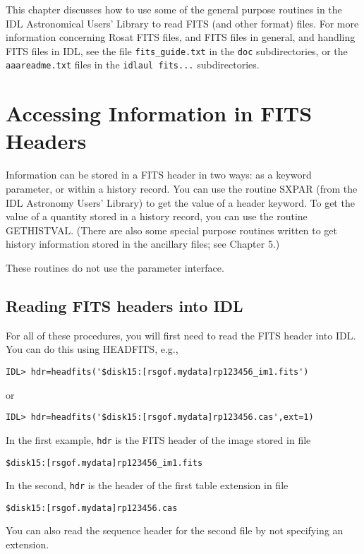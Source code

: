 This chapter discusses how to use some of the general purpose routines in the
IDL Astronomical Users' Library to read FITS (and other format) files. For more
information concerning Rosat FITS files, and FITS files in general, and
handling FITS files in IDL, see the file {\tt fits{\_}guide.txt} in the {\tt doc}
subdirectories, or the {\tt aaareadme.txt} files in the {\tt idlaul~fits...}
subdirectories.
 

\section{Accessing Information in FITS Headers}
 
Information can be stored in a FITS header in two ways: as a keyword parameter,
or within a history record. You can use the routine SXPAR (from the IDL
Astronomy Users' Library) to get the value of a header keyword. To get the
value of a quantity stored in a history record, you can use the routine
GETHISTVAL. (There are also some special purpose routines written to get
history information stored in the ancillary files; see Chapter 5.)
 
These routines do not use the parameter interface.
 

\subsection{Reading FITS headers into IDL}
 
For all of these procedures, you will first need to read the FITS header into
IDL. You can do this using HEADFITS, e.g.,

\medskip\noindent
\begin{verbatim}
IDL> hdr=headfits('$disk15:[rsgof.mydata]rp123456_im1.fits')
\end{verbatim}
or

\medskip\noindent
\begin{verbatim}
IDL> hdr=headfits('$disk15:[rsgof.mydata]rp123456.cas',ext=1)
\end{verbatim}
In the first example, {\tt hdr} is the FITS header of the image stored in file

\medskip\noindent
\begin{verbatim}
$disk15:[rsgof.mydata]rp123456_im1.fits
\end{verbatim}
In the second, {\tt hdr} is the header of the first table extension in file

\medskip\noindent
\begin{verbatim}
$disk15:[rsgof.mydata]rp123456.cas
\end{verbatim}
You can also read the sequence header for the second file by not specifying an
extension.
 

